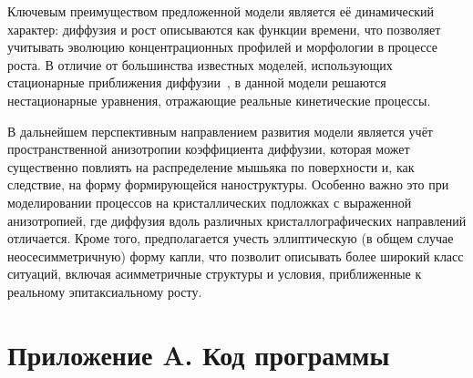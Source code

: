 \documentclass[14pt,oneside]{extarticle}
\begin{document}
Ключевым преимуществом предложенной модели является её динамический характер: диффузия и рост описываются как функции времени, что позволяет учитывать эволюцию концентрационных профилей и морфологии в процессе роста. В отличие от большинства известных моделей, использующих стационарные приближения диффузии~\cite{zhou2013}, в данной модели решаются нестационарные уравнения, отражающие реальные кинетические процессы.

В дальнейшем перспективным направлением развития модели является учёт пространственной анизотропии коэффициента диффузии, которая может существенно повлиять на распределение мышьяка по поверхности и, как следствие, на форму формирующейся наноструктуры. Особенно важно это при моделировании процессов на кристаллических подложках с выраженной анизотропией, где диффузия вдоль различных кристаллографических направлений отличается. Кроме того, предполагается учесть эллиптическую (в общем случае неосесимметричную) форму капли, что позволит описывать более широкий класс ситуаций, включая асимметричные структуры и условия, приближенные к реальному эпитаксиальному росту.

\clearpage
{}
\printbibliography


\clearpage
\appendix

\section*{Приложение A. Код программы}
\end{document}
